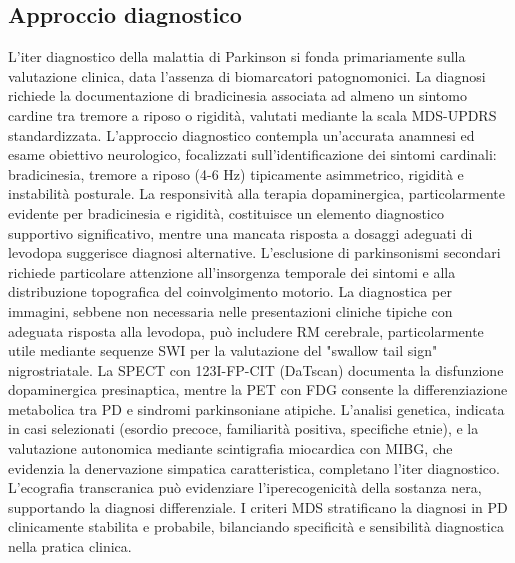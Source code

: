 \subsection{Approccio diagnostico}
L'iter diagnostico della malattia di Parkinson si fonda primariamente sulla valutazione clinica, data l'assenza di biomarcatori patognomonici. La diagnosi richiede la documentazione di bradicinesia associata ad almeno un sintomo cardine tra tremore a riposo o rigidità, valutati mediante la scala MDS-UPDRS standardizzata.
L'approccio diagnostico contempla un'accurata anamnesi ed esame obiettivo neurologico, focalizzati sull'identificazione dei sintomi cardinali: bradicinesia, tremore a riposo (4-6 Hz) tipicamente asimmetrico, rigidità e instabilità posturale. La responsività alla terapia dopaminergica, particolarmente evidente per bradicinesia e rigidità, costituisce un elemento diagnostico supportivo significativo, mentre una mancata risposta a dosaggi adeguati di levodopa suggerisce diagnosi alternative.
L'esclusione di parkinsonismi secondari richiede particolare attenzione all'insorgenza temporale dei sintomi e alla distribuzione topografica del coinvolgimento motorio. La diagnostica per immagini, sebbene non necessaria nelle presentazioni cliniche tipiche con adeguata risposta alla levodopa, può includere RM cerebrale, particolarmente utile mediante sequenze SWI per la valutazione del "swallow tail sign" nigrostriatale. La SPECT con 123I-FP-CIT (DaTscan) documenta la disfunzione dopaminergica presinaptica, mentre la PET con FDG consente la differenziazione metabolica tra PD e sindromi parkinsoniane atipiche.
L'analisi genetica, indicata in casi selezionati (esordio precoce, familiarità positiva, specifiche etnie), e la valutazione autonomica mediante scintigrafia miocardica con MIBG, che evidenzia la denervazione simpatica caratteristica, completano l'iter diagnostico. L'ecografia transcranica può evidenziare l'iperecogenicità della sostanza nera, supportando la diagnosi differenziale.
I criteri MDS stratificano la diagnosi in PD clinicamente stabilita e probabile, bilanciando specificità e sensibilità diagnostica nella pratica clinica.

